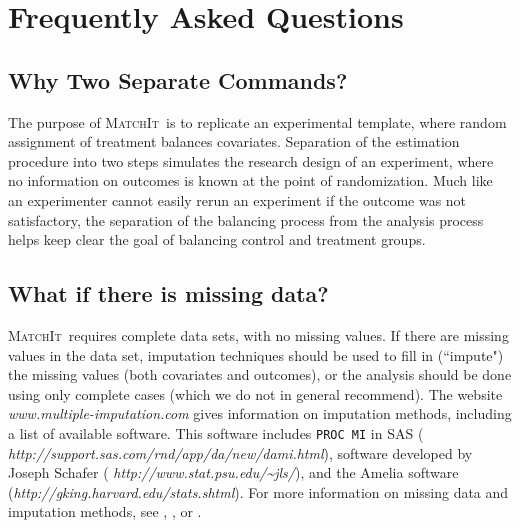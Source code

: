 \documentclass[oneside,letterpaper,titlepage]{article}
\newcommand{\MatchIt}{\textsc{MatchIt}}
\begin{document}
\section{Frequently Asked Questions}

\subsection{Why Two Separate Commands?}
The purpose of \MatchIt\ is to replicate an experimental template,
where random assignment of treatment balances covariates.  Separation
of the estimation procedure into two steps simulates the research design of an experiment,
where no information on outcomes is known at the point of
randomization.  Much like an experimenter cannot easily rerun an
experiment if the outcome was not satisfactory, the separation of the
balancing process from the analysis process helps keep clear the goal
of balancing control and treatment groups. 

\subsection{What if there is missing data?}
\MatchIt\ requires complete data sets, with no missing values.  If
there are missing values in the data set, imputation techniques should
be used to fill in (``impute") the missing values (both covariates and
outcomes), or the analysis should be done using only complete cases
(which we do not in general recommend).  The website {\em
  www.multiple-imputation.com} gives information on imputation
methods, including a list of available software.  This software
includes \texttt{PROC MI} in SAS ({\em
  http://support.sas.com/rnd/app/da/new/dami.html}),
software developed by Joseph Schafer ({\em
  http://www.stat.psu.edu/\~{}jls/}), and the Amelia software 
({\em http://gking.harvard.edu/stats.shtml}).  For more information on
missing data and imputation methods, see 
\cite{KinHonJos01}, \cite{LitRub02}, or \cite{Schafer97}.  
\end{document}

